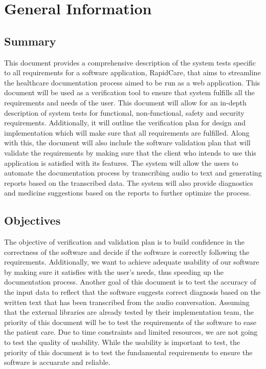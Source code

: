 \documentclass[12pt, titlepage]{article}
\begin{document}

\newpage


\section{General Information}

\subsection{Summary}

This document provides a comprehensive description of the system tests specific to all requirements for a software application, RapidCare, that aims to streamline the healthcare documentation process aimed to be run as a web application. This document will be used as a verification tool to ensure that system fulfills all the requirements and needs of the user. This document will allow for an in-depth description of system tests for functional, non-functional, safety and security requirements. Additionally, it will outline the verification plan for design and implementation which will make sure that all requirements are fulfilled. Along with this, the document will also include the software validation plan that will validate the requirements by making sure that the client who intends to use this application is satisfied with its features. The system will allow the users to automate the documentation process by transcribing audio to text and generating reports based on the transcribed data. The system will also provide diagnostics and medicine suggestions based on the reports to further optimize the process.    

\subsection{Objectives}

The objective of verification and validation plan is to build confidence in the correctness of the software and decide if the software is correctly following the requirements. Additionally, we want to achieve adequate usability of our software by making sure it satisfies with the user's needs, thus speeding up the documentation process. Another goal of this document is to test the accuracy of the input data to reflect that the software suggests correct diagnosis based on the written text that has been transcribed from the audio conversation. Assuming that the external libraries are already tested by their implementation team, the priority of this document will be to test the requirements of the software to ease the patient care. Due to time constraints and limited resources, we are not going to test the quality of usability. While the usability is important to test, the priority of this document is to test the fundamental requirements to ensure the software is accuarate and reliable. 
\end{document}
